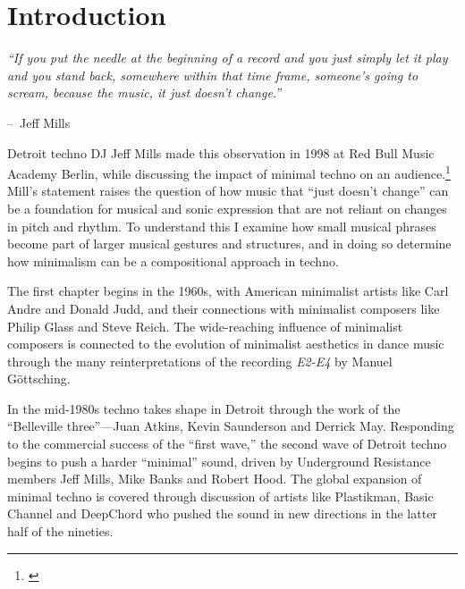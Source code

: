 \documentclass[12pt,twoside]{reedthesis}
\makeatletter
\newenvironment{chapquote}[2][2em]
  {\setlength{\@tempdima}{#1}
  \def\chapquote@author{#2}
  \parshape 1 \@tempdima \dimexpr\textwidth-2\@tempdima\relax%
  \itshape}
  {\par\normalfont\hfill--\ \chapquote@author\hspace*{\@tempdima}\par\bigskip}
\makeatother
\begin{document}
\chapter*{Introduction}

\onehalfspacing

\begin{chapquote}{Jeff Mills}
	``If you put the needle at the beginning of a record and you just simply let it play and you stand back, somewhere within that time frame, someone’s going to scream, because the music, it just doesn’t change.''
\end{chapquote}

Detroit techno DJ Jeff Mills made this observation in 1998 at Red Bull Music Academy Berlin, while discussing the impact of minimal techno on an audience.\footnote{\cite{schmidtJeffMillsLecture1998a}} Mill's statement raises the question of how music that ``just doesn't change'' can be a foundation for musical and sonic expression that are not reliant on changes in pitch and rhythm. To understand this I examine how small musical phrases become part of larger musical gestures and structures, and in doing so determine how minimalism can be a compositional approach in techno.

The first chapter begins in the 1960s, with American minimalist artists like Carl Andre and Donald Judd, and their connections with minimalist composers like Philip Glass and Steve Reich. The wide-reaching influence of minimalist composers is connected to the evolution of minimalist aesthetics in dance music through the many reinterpretations of the recording \emph{E2-E4} by Manuel G{\"o}ttsching.

In the mid-1980s techno takes shape in Detroit through the work of the ``Belleville three''---Juan Atkins, Kevin Saunderson and Derrick May. Responding to the commercial success of the ``first wave,'' the second wave of Detroit techno begins to push a harder ``minimal'' sound, driven by Underground Resistance members Jeff Mills, Mike Banks and Robert Hood. The global expansion of minimal techno is covered through discussion of artists like Plastikman, Basic Channel and DeepChord who pushed the sound in new directions in the latter half of the nineties.
\end{document}
